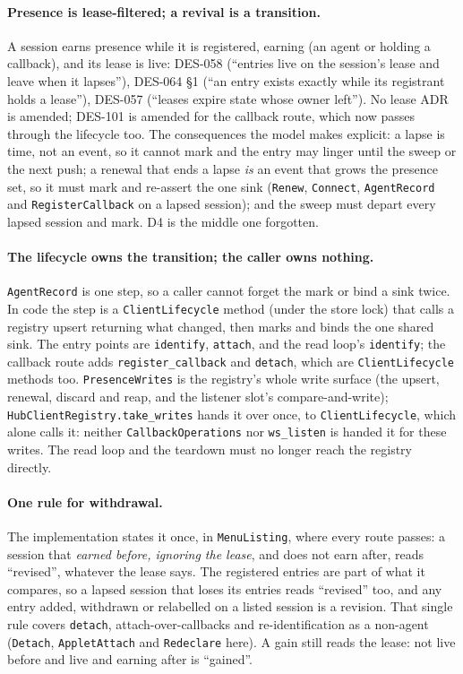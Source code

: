 \documentclass[a4paper,10pt,fleqn]{article}
\begin{document}
\paragraph{Presence is lease-filtered; a revival is a transition.}
A session earns presence while it is registered, earning (an agent or holding
a callback), and its lease is live: DES-058 (``entries live on the session's
lease and leave when it lapses''), DES-064 \S1 (``an entry exists exactly while
its registrant holds a lease''), DES-057 (``leases expire state whose owner
left''). No lease ADR is amended; DES-101 is amended for the callback route,
which now passes through the lifecycle too. The consequences the model makes explicit: a lapse
is time, not an event, so it cannot mark and the entry may linger until the
sweep or the next push; a renewal that ends a lapse \emph{is} an event that
grows the presence set, so it must mark and re-assert the one sink
(\texttt{Renew}, \texttt{Connect}, \texttt{AgentRecord} and
\texttt{RegisterCallback} on a lapsed session); and the sweep must depart every
lapsed session and mark. D4 is the middle one forgotten.

\paragraph{The lifecycle owns the transition; the caller owns nothing.}
\texttt{AgentRecord} is one step, so a caller cannot forget the mark or bind
a sink twice. In code the step is a \texttt{ClientLifecycle} method (under the
store lock) that calls a registry upsert returning what changed, then marks and
binds the one shared sink. The entry points are \texttt{identify},
\texttt{attach}, and the read loop's \texttt{identify}; the callback route adds
\texttt{register\_callback} and \texttt{detach}, which are \texttt{ClientLifecycle}
methods too. \texttt{PresenceWrites} is the registry's whole write surface (the
upsert, renewal, discard and reap, and the listener slot's compare-and-write);
\texttt{HubClientRegistry.take\_writes} hands it over once, to
\texttt{ClientLifecycle}, which alone calls it: neither
\texttt{CallbackOperations} nor \texttt{ws\_listen} is handed it for these
writes. The read loop and the teardown must no longer reach the registry
directly.

\paragraph{One rule for withdrawal.}
The implementation states it once, in \texttt{MenuListing}, where every route
passes: a session that \emph{earned before, ignoring the lease}, and does not
earn after, reads ``revised'', whatever the lease says. The registered entries are
part of what it compares, so a lapsed session that loses its entries reads
``revised'' too, and any entry added, withdrawn or relabelled on a listed session
is a revision. That single rule covers
\texttt{detach}, attach-over-callbacks and re-identification as a non-agent
(\texttt{Detach}, \texttt{AppletAttach} and \texttt{Redeclare} here). A gain
still reads the lease: not live before and live and earning after is
``gained''.
\end{document}
